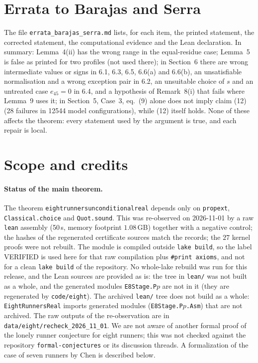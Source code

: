 \documentclass[11pt]{amsart}
\theoremstyle{plain}
\theoremstyle{definition}
\theoremstyle{remark}
\newcommand{\lean}[1]{{\def\_{\textunderscore\allowbreak}\def\.{.\allowbreak}\texttt{#1}}}
\begin{document}
\section{Errata to Barajas and Serra}\label{sec:errata}
The file \texttt{errata\_barajas\_serra.md} lists, for each item, the printed statement, the
corrected statement, the computational evidence and the Lean declaration. In summary:
Lemma~4(ii) has the wrong range in the equal-residue case; Lemma~5 is false as printed for two
profiles (not used there); in Section~6 there are wrong intermediate values or signs in 6.1, 6.3,
6.5, 6.6(a) and 6.6(b), an unsatisfiable normalisation and a wrong exception pair in 6.2, an
unsuitable choice of $s$ and an untreated case $e_{45}=0$ in 6.4, and a hypothesis of Remark~8(i)
that fails where Lemma~9 uses it; in Section~5, Case~3, eq.~(9) alone does not imply claim (12)
(28 failures in 12544 model configurations), while (12) itself holds. None of these affects the
theorem: every statement used by the argument is true, and each repair is local.

\section{Scope and credits}
\paragraph{Status of the main theorem.} The theorem \lean{eight\_runners\_unconditional\_real} depends only on
\lean{propext}, \lean{Classical.choice} and \lean{Quot.sound}. This was re-observed on 2026-11-01 by a raw
\lean{lean} assembly (50\,s, memory footprint $1.08$\,GB) together with a negative control; the hashes of the
regenerated certificate sources match the records; the $27$ kernel proofs were not rebuilt. The module is
compiled outside \lean{lake build}, so the label VERIFIED is used here for that raw compilation plus
\lean{\#print axioms}, and not for a clean \lean{lake build} of the repository. No whole-lake rebuild was
run for this release, and the Lean sources are provided as is: the tree in \texttt{lean/} was not built as a
whole, and the generated modules \lean{E8Stage.P}$p$ are not in it (they are regenerated by \texttt{code/eight}).
The archived \texttt{lean/} tree does not build as a whole: \lean{EightRunnersReal} imports generated modules (\lean{E8Stage.P}$p$\lean{.Asm}) that are not archived. The raw outputs of the re-observation are in \texttt{data/eight/recheck\_2026\_11\_01}. We are not aware of
another formal proof of the lonely runner conjecture for eight runners; this was not checked against the
repository \texttt{formal-conjectures} or its discussion threads. A formalization of the case of seven runners
by Chen \cite{chen} is described below.
\end{document}
